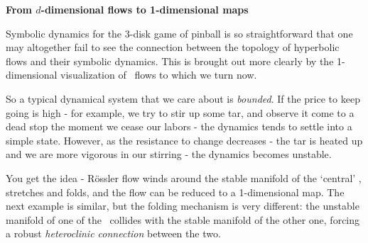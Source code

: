 {\bf From $d$-dimensional flows to 1-dimensional maps}

Symbolic dynamics for the $3$-disk game of pinball is so
straight\-forward that one may altogether fail to see the
connection between the topology of hyperbolic flows and their
symbolic dynamics. This is brought out more
clearly by the 1-dimensional visualization of \stretchf\ flows
to which we turn now.

So a typical dynamical system
that we care about is {\em bounded}. If the price to keep going
is high - for example, we try to stir up some tar, and observe
it come to a dead stop the moment we cease our labors - the
dynamics tends to settle into a simple state. However,
as the resistance to change decreases - the tar is heated up
and we are more vigorous in our stirring - the dynamics becomes
unstable.



You get the idea - R\"ossler flow winds around the stable manifold of the
`central' \eqv, stretches and folds, and  the
flow can be reduced to a 1-dimensional map. The next example is
similar, but the folding mechanism is very different: the unstable
manifold of one of the \eqva\ collides with the stable manifold
of the other one, forcing a robust {\em heteroclinic
connection} between the two.

